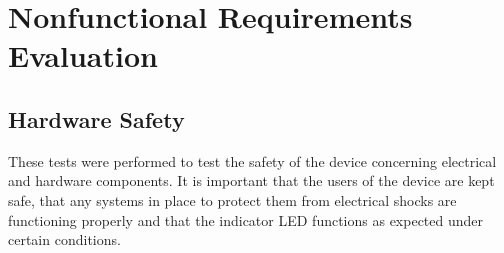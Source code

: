 \documentclass[12pt, titlepage]{article}
\begin{document}
\section{Nonfunctional Requirements Evaluation}
\subsection{Hardware Safety }

These tests were performed to test the safety of the device concerning electrical and hardware components. It is important that the users of the device are kept safe, that any systems in place to protect them from electrical shocks are functioning properly and that the indicator LED functions as expected under certain conditions.
\end{document}
